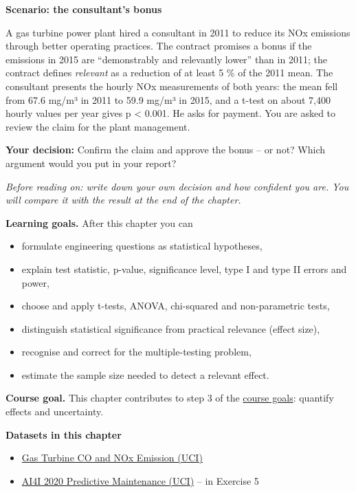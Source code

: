 \documentclass[
  letterpaper,
  DIV=11,
  numbers=noendperiod]{scrreprt}
\providecommand{\tightlist}{%
  \setlength{\itemsep}{0pt}\setlength{\parskip}{0pt}}\usepackage{longtable,booktabs,array}
\begin{document}
\textbf{Scenario: the consultant's bonus}

A gas turbine power plant hired a consultant in 2011 to reduce its NOx
emissions through better operating practices. The contract promises a
bonus if the emissions in 2015 are ``demonstrably and relevantly lower''
than in 2011; the contract defines \emph{relevant} as a reduction of at
least 5 \% of the 2011 mean. The consultant presents the hourly NOx
measurements of both years: the mean fell from 67.6 mg/m³ in 2011 to
59.9 mg/m³ in 2015, and a t-test on about 7,400 hourly values per year
gives p \textless{} 0.001. He asks for payment. You are asked to review
the claim for the plant management.

\textbf{Your decision:} Confirm the claim and approve the bonus -- or
not? Which argument would you put in your report?

\emph{Before reading on: write down your own decision and how confident
you are. You will compare it with the result at the end of the chapter.}

\textbf{Learning goals.} After this chapter you can

\begin{itemize}
\tightlist
\item
  formulate engineering questions as statistical hypotheses,
\item
  explain test statistic, p-value, significance level, type I and type
  II errors and power,
\item
  choose and apply t-tests, ANOVA, chi-squared and non-parametric tests,
\item
  distinguish statistical significance from practical relevance (effect
  size),
\item
  recognise and correct for the multiple-testing problem,
\item
  estimate the sample size needed to detect a relevant effect.
\end{itemize}

\textbf{Course goal.} This chapter contributes to step 3 of the
\hyperref[what-you-will-be-able-to-do]{course goals}: quantify effects
and uncertainty.

\textbf{Datasets in this chapter}

\begin{itemize}
\tightlist
\item
  \href{https://archive.ics.uci.edu/dataset/551/gas+turbine+co+and+nox+emission+data+set}{Gas
  Turbine CO and NOx Emission (UCI)}
\item
  \href{https://archive.ics.uci.edu/dataset/601/ai4i+2020+predictive+maintenance+dataset}{AI4I
  2020 Predictive Maintenance (UCI)} -- in Exercise 5
\end{itemize}
\end{document}
